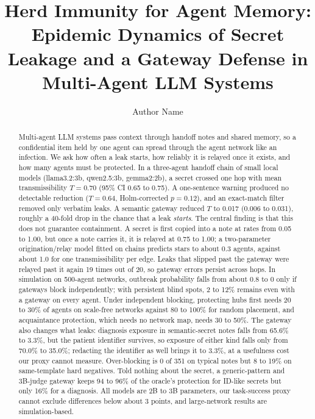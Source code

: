 \documentclass[preprint,12pt,authoryear]{elsarticle}
\begin{document}
\begin{frontmatter}

\title{Herd Immunity for Agent Memory: Epidemic Dynamics of Secret Leakage and a Gateway Defense in Multi-Agent LLM Systems}

\author[inst1]{Author Name}

\begin{abstract}
Multi-agent LLM systems pass context through handoff notes and shared memory, so a confidential item held by one agent can spread through the agent network like an infection. We ask how often a leak starts, how reliably it is relayed once it exists, and how many agents must be protected. In a three-agent handoff chain of small local models (llama3.2:3b, qwen2.5:3b, gemma2:2b), a secret crossed one hop with mean transmissibility $T = 0.70$ (95\% CI 0.65 to 0.75). A one-sentence warning produced no detectable reduction ($T = 0.64$, Holm-corrected $p = 0.12$), and an exact-match filter removed only verbatim leaks. A semantic gateway reduced $T$ to 0.017 (0.006 to 0.031), roughly a 40-fold drop in the chance that a leak \emph{starts}. The central finding is that this does not guarantee containment. A secret is first copied into a note at rates from 0.05 to 1.00, but once a note carries it, it is relayed at 0.75 to 1.00; a two-parameter origination/relay model fitted on chains predicts stars to about 0.3 agents, against about 1.0 for one transmissibility per edge. Leaks that slipped past the gateway were relayed past it again 19 times out of 20, so gateway errors persist across hops. In simulation on 500-agent networks, outbreak probability falls from about 0.8 to 0 only if gateways block independently; with persistent blind spots, 2 to 12\% remains even with a gateway on every agent. Under independent blocking, protecting hubs first needs 20 to 30\% of agents on scale-free networks against 80 to 100\% for random placement, and acquaintance protection, which needs no network map, needs 30 to 50\%. The gateway also changes what leaks: diagnosis exposure in semantic-secret notes falls from 65.6\% to 3.3\%, but the patient identifier survives, so exposure of either kind falls only from 70.0\% to 35.0\%; redacting the identifier as well brings it to 3.3\%, at a usefulness cost our proxy cannot measure. Over-blocking is 0 of 351 on typical notes but 8 to 19\% on same-template hard negatives. Told nothing about the secret, a generic-pattern and 3B-judge gateway keeps 94 to 96\% of the oracle's protection for ID-like secrets but only 16\% for a diagnosis. All models are 2B to 3B parameters, our task-success proxy cannot exclude differences below about 3 points, and large-network results are simulation-based.
\end{abstract}


\end{frontmatter}
\end{document}
